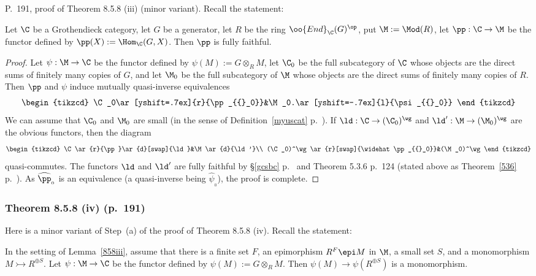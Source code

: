 \documentclass[12pt]{article}
\theoremstyle{remark}
\theoremstyle{definition}
\begin{document}
\begin{s} P.~191, proof of Theorem 8.5.8 (iii) (minor variant). Recall the statement: 

\begin{lem}
Let $\C$ be a Grothendieck category, let $G$ be a generator, let $R$ be the ring $\oo{End}_\C(G)^{\op}$, put $\M:=\Mod(R)$, let $\pp:\C\to\M$ be the functor defined by $\pp(X):=\Hom_\C(G,X)$. Then $\pp$ is fully faithful. 
\end{lem}

\begin{proof}
Let $\psi:\M\to\C$ be the functor defined by $\psi(M):=G\otimes_RM$, let $\C_0$ be the full subcategory of $\C$ whose objects are the direct sums of finitely many copies of $G$, and let $\M_0$ be the full subcategory of $\M$ whose objects are the direct sums of finitely many copies of $R$. Then $\pp$ and $\psi$ induce mutually quasi-inverse equivalences 
$$
\begin{tikzcd}
\C_0\ar[yshift=.7ex]{r}{\pp_{{}_0}}&\M_0.\ar[yshift=-.7ex]{l}{\psi_{{}_0}}
\end{tikzcd}
$$ 
We can assume that $\C_0$ and $\M_0$ are small (in the sense of Definition~\ref{myuscat} p.~). If $\ld:\C\to(\C_0)^\wg$ and $\ld':\M\to(\M_0)^\wg$ are the obvious functors, then the diagram 
$$
\begin{tikzcd}
\C\ar{r}{\pp}\ar{d}[swap]{\ld}&\M\ar{d}{\ld'}\\
(\C_0)^\wg\ar{r}[swap]{\widehat\pp_{{}_0}}&(\M_0)^\wg
\end{tikzcd}
$$ 
quasi-commutes. The functors $\ld$ and $\ld'$ are fully faithful by \S\ref{gcsbc} p.~ and Theorem 5.3.6 p.~124 (stated above as Theorem~\ref{536} p.~). As $\widehat\pp_{{}_0}$ is an equivalence (a quasi-inverse being $\widehat\psi_{{}_0}$), the proof is complete.
\end{proof}
\end{s}


\subsubsection{Theorem 8.5.8 (iv) (p.~191)} 

Here is a minor variant of Step~(a) of the proof of Theorem 8.5.8 (iv). Recall the statement: 

\begin{lem}
In the setting of Lemma~\ref{858iii}, assume that there is a finite set $F$, an epimorphism $R^F\epi M$ in $\M$, a small set $S$, and a monomorphism $M\rightarrowtail R^{\oplus S}$. Let $\psi:\M\to\C$ be the functor defined by $\psi(M):=G\otimes_RM$. Then $\psi(M)\to\psi(R^{\oplus S})$ is a monomorphism. 
\end{lem}
\end{document}
